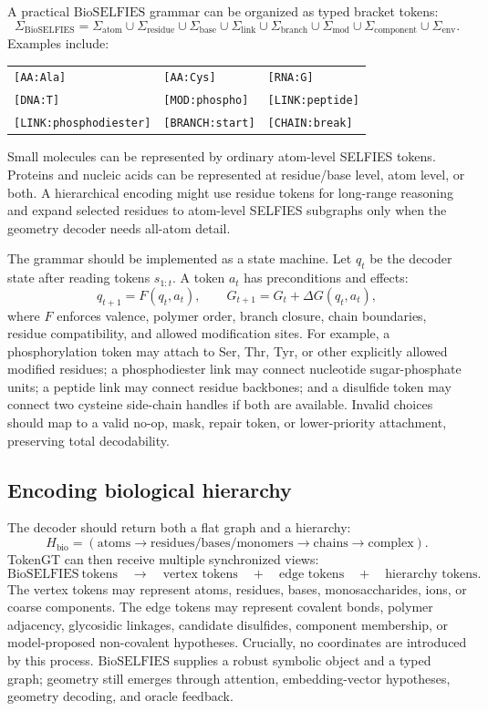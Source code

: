 \documentclass[11pt]{article}
\newcommand{\bioselfies}{\mathrm{BioSELFIES}}
\begin{document}
A practical $\bioselfies$ grammar can be organized as typed bracket tokens:
\[
\Sigma_{\bioselfies}
=
\Sigma_{\mathrm{atom}}
\cup\Sigma_{\mathrm{residue}}
\cup\Sigma_{\mathrm{base}}
\cup\Sigma_{\mathrm{link}}
\cup\Sigma_{\mathrm{branch}}
\cup\Sigma_{\mathrm{mod}}
\cup\Sigma_{\mathrm{component}}
\cup\Sigma_{\mathrm{env}}.
\]
Examples include:
\begin{center}
\begin{tabular}{lll}
\texttt{[AA:Ala]} & \texttt{[AA:Cys]} & \texttt{[RNA:G]}\\
\texttt{[DNA:T]} & \texttt{[MOD:phospho]} & \texttt{[LINK:peptide]}\\
\texttt{[LINK:phosphodiester]} & \texttt{[BRANCH:start]} & \texttt{[CHAIN:break]}
\end{tabular}
\end{center}
Small molecules can be represented by ordinary atom-level SELFIES tokens. Proteins and nucleic acids can be represented at residue/base level, atom level, or both. A hierarchical encoding might use residue tokens for long-range reasoning and expand selected residues to atom-level SELFIES subgraphs only when the geometry decoder needs all-atom detail.

The grammar should be implemented as a state machine. Let $q_t$ be the decoder state after reading tokens $s_{1:t}$. A token $a_t$ has preconditions and effects:
\[
q_{t+1}=F(q_t,a_t),\qquad
G_{t+1}=G_t+\Delta G(q_t,a_t),
\]
where $F$ enforces valence, polymer order, branch closure, chain boundaries, residue compatibility, and allowed modification sites. For example, a phosphorylation token may attach to Ser, Thr, Tyr, or other explicitly allowed modified residues; a phosphodiester link may connect nucleotide sugar-phosphate units; a peptide link may connect residue backbones; and a disulfide token may connect two cysteine side-chain handles if both are available. Invalid choices should map to a valid no-op, mask, repair token, or lower-priority attachment, preserving total decodability.

\subsection{Encoding biological hierarchy}

The decoder should return both a flat graph and a hierarchy:
\[
H_{\mathrm{bio}}
=
\left(
\text{atoms}\to\text{residues/bases/monomers}\to\text{chains}\to\text{complex}
\right).
\]
TokenGT can then receive multiple synchronized views:
\[
\bioselfies\ \text{tokens}
\quad\longrightarrow\quad
\text{vertex tokens}
\quad+\quad
\text{edge tokens}
\quad+\quad
\text{hierarchy tokens}.
\]
The vertex tokens may represent atoms, residues, bases, monosaccharides, ions, or coarse components. The edge tokens may represent covalent bonds, polymer adjacency, glycosidic linkages, candidate disulfides, component membership, or model-proposed non-covalent hypotheses. Crucially, no coordinates are introduced by this process. $\bioselfies$ supplies a robust symbolic object and a typed graph; geometry still emerges through attention, embedding-vector hypotheses, geometry decoding, and oracle feedback.
\end{document}
